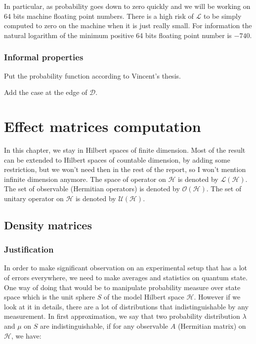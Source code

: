 \documentclass[10pt]{report}
\theoremstyle{plain}
\theoremstyle{definition}
\theoremstyle{remark}
\begin{document}
In particular, as probability goes down to zero quickly and we will be working on
64 bits machine floating point numbers. There is a high risk of $\mathcal{L}$ to
be simply computed to zero on the machine when it is just really small. For
information the natural logarithm of the minimum positive 64 bits floating point number
is $-740$.

\subsection{Informal properties}

Put the probability function according to Vincent's thesis.

Add the case at the edge of $\mathcal{D}$.

\chapter{Effect matrices computation}

In this chapter, we stay in Hilbert spaces of finite dimension. Most of the
result can be extended to Hilbert spaces of countable dimension, by adding
some restriction,
but we won't need then in the rest of the report, so I won't mention infinite
dimension anymore. The space of operator on
$\mathcal{H}$ is denoted by $\mathcal{L}(\mathcal{H})$. The set of observable
(Hermitian operators) is denoted by $\mathcal{O}(\mathcal{H})$. The set of
unitary operator on $\mathcal{H}$ is denoted by $\mathcal{U}(\mathcal{H})$.

\section{Density matrices}

\subsection{Justification}

In order to make significant observation on an experimental setup that has a lot
of errors everywhere, we need to make averages and statistics on quantum state.
One way of doing that would be to manipulate probability measure over state
space which is the unit sphere $S$ of the model Hilbert space $\mathcal{H}$. However if we look at
it in details, there are a lot of distributions that indistinguishable by any
measurement. In first approximation, we say that two probability distribution
$\lambda$ and $\mu$ on $S$ are indistinguishable,
if for any observable $A$ (Hermitian matrix) on $\mathcal{H}$, we
have:
\end{document}
